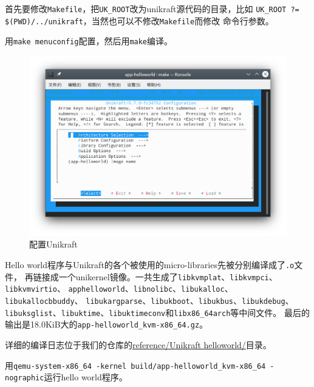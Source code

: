\documentclass{../runikraft-report}
\begin{document}
首先要修改\texttt{Makefile}，把\texttt{UK\_ROOT}改为unikraft源代码的目录，比如
\texttt{UK\_ROOT ?= \linebreak\$(PWD)/../unikraft}，当然也可以不修改\texttt{Makefile}而修改
命令行参数。

用\texttt{make menuconfig}配置，然后用\texttt{make}编译。
\begin{figure}[!hbt]
\centering
\vspace*{-3ex}
\includegraphics[width=0.9\linewidth]{assets/unikraft-menuconfig}
\vspace*{-3ex}
\caption{配置Unikraft}
\label{fig:unikraft-menuconfig}
\end{figure}
Hello world程序与Unikraft的各个被使用的micro-libraries先被分别编译成了\texttt{.o}文件，
再链接成一个unikernel镜像。一共生成了\texttt{libkvmplat}、\texttt{libkvmpci}、\texttt{libkvmvirtio}、
\texttt{apphelloworld}、\texttt{libnolibc}、\texttt{libukalloc}、\texttt{libukallocbbuddy}、
\texttt{libukargparse}、\texttt{libukboot}、\texttt{libukbus}、\texttt{libukdebug}、
\texttt{libuksglist}、\texttt{libuktime}、\texttt{libuktimeconv}和\texttt{libx86\_64arch}等中间文件。
最后的输出是18.0KiB大的\texttt{app-\linebreak helloworld\_kvm-x86\_64.gz}。

详细的编译日志位于我们的仓库的\href{https://github.com/OSH-2022/x-runikraft/tree/d22ccf0c1b248667148fd8953b71b6e0258de6a3/reference/Unikraft%20helloworld}{reference/Unikraft helloworld/}目录。

用\texttt{qemu-system-x86\_64 -kernel build/app-helloworld\_kvm-x86\_64 -nographic}\linebreak 运行hello world程序。
\end{document}
